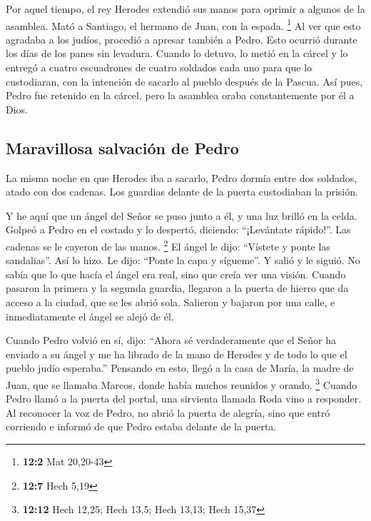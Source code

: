 \begin{paracol}{2}
 Por aquel tiempo, el rey Herodes extendió sus manos para
oprimir a algunos de la asamblea.  Mató a Santiago, el
hermano de Juan, con la espada. \footnote{\textbf{12:2} Mat 20,20-43}
 Al ver que esto agradaba a los judíos, procedió a apresar
también a Pedro. Esto ocurrió durante los días de los panes sin
levadura.  Cuando lo detuvo, lo metió en la cárcel y lo
entregó a cuatro escuadrones de cuatro soldados cada uno para que lo
custodiaran, con la intención de sacarlo al pueblo después de la Pascua.
 Así pues, Pedro fue retenido en la cárcel, pero la
asamblea oraba constantemente por él a Dios.

\hypertarget{maravillosa-salvaciuxf3n-de-pedro}{%
\subsection{Maravillosa salvación de
Pedro}\label{maravillosa-salvaciuxf3n-de-pedro}}

 La misma noche en que Herodes iba a sacarlo, Pedro dormía
entre dos soldados, atado con dos cadenas. Los guardias delante de la
puerta custodiaban la prisión.

 Y he aquí que un ángel del Señor se puso junto a él, y
una luz brilló en la celda. Golpeó a Pedro en el costado y lo despertó,
diciendo: ``¡Levántate rápido!''. Las cadenas se le cayeron de las
manos. \footnote{\textbf{12:7} Hech 5,19}  El ángel le
dijo: ``Vístete y ponte las sandalias''. Así lo hizo. Le dijo: ``Ponte
la capa y sígueme''.  Y salió y le siguió. No sabía que lo
que hacía el ángel era real, sino que creía ver una visión.
 Cuando pasaron la primera y la segunda guardia, llegaron
a la puerta de hierro que da acceso a la ciudad, que se les abrió sola.
Salieron y bajaron por una calle, e inmediatamente el ángel se alejó de
él.

 Cuando Pedro volvió en sí, dijo: ``Ahora sé
verdaderamente que el Señor ha enviado a su ángel y me ha librado de la
mano de Herodes y de todo lo que el pueblo judío esperaba.''
 Pensando en esto, llegó a la casa de María, la madre de
Juan, que se llamaba Marcos, donde había muchos reunidos y orando.
\footnote{\textbf{12:12} Hech 12,25; Hech 13,5; Hech 13,13; Hech 15,37}
 Cuando Pedro llamó a la puerta del portal, una sirvienta
llamada Roda vino a responder.  Al reconocer la voz de
Pedro, no abrió la puerta de alegría, sino que entró corriendo e informó
de que Pedro estaba delante de la puerta.


\end{paracol}
